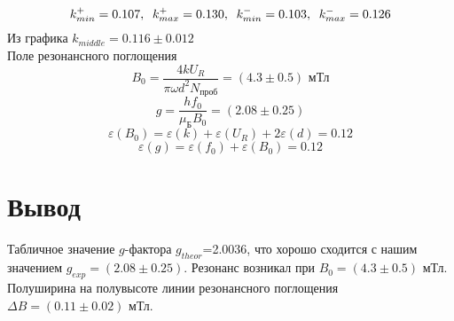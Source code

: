 \documentclass[a4paper,16pt]{article}
\begin{document}
\begin{figure}[h!]
\centering	
{}
\end{figure}
\begin{equation}
k_{min}^+=0.107, \hspace{5dd} k_{max}^+=0.130, \hspace{5dd} k_{min}^-=0.103, \hspace{5dd} k_{max}^-=0.126
\end{equation}
Из графика $k_{middle}=0.116\pm0.012$\\
Поле резонансного поглощения
\begin{equation}
B_0=\frac{4kU_R}{\pi\omega d^2N_{\text{проб}}}=(4.3\pm0.5)\text{ мТл}
\end{equation}
\begin{equation}
g=\frac{hf_0}{\mu_{\text{Б}}B_0}=(2.08\pm0.25)
\end{equation}
\begin{equation}
\varepsilon(B_0)=\varepsilon(k)+\varepsilon(U_R)+2\varepsilon(d)=0.12
\end{equation}
\begin{equation}
\varepsilon(g)=\varepsilon(f_0)+\varepsilon(B_0)=0.12
\end{equation}
\section{Вывод}

Табличное значение $g$-фактора $g_{theor}$=2.0036, что хорошо сходится с нашим значением $g_{exp}=(2.08\pm0.25)$. 
Резонанс возникал при $B_0=(4.3\pm0.5)$ мТл. Полуширина на полувысоте линии резонансного поглощения $\Delta B=(0.11\pm0.02)$ мТл.
\end{document}

